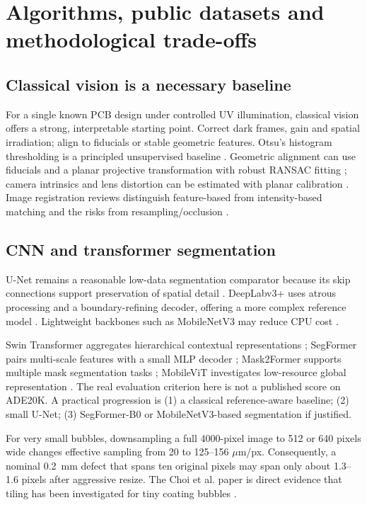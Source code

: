\section{Algorithms, public datasets and methodological trade-offs}
\subsection{Classical vision is a necessary baseline}
For a single known PCB design under controlled UV illumination, classical vision offers a strong, interpretable starting point. Correct dark frames, gain and spatial irradiation; align to fiducials or stable geometric features. Otsu's histogram thresholding is a principled unsupervised baseline \citep{otsu1979}. Geometric alignment can use fiducials and a planar projective transformation with robust RANSAC fitting \citep{fischler1981ransac}; camera intrinsics and lens distortion can be estimated with planar calibration \citep{zhang2000calibration}. Image registration reviews distinguish feature-based from intensity-based matching and the risks from resampling/occlusion \citep{zitova2003registration}.

\subsection{CNN and transformer segmentation}
U-Net remains a reasonable low-data segmentation comparator because its skip connections support preservation of spatial detail \citep{ronneberger2015unet}. DeepLabv3+ uses atrous processing and a boundary-refining decoder, offering a more complex reference model \citep{chen2018deeplab}. Lightweight backbones such as MobileNetV3 may reduce CPU cost \citep{howard2019mobile}.

Swin Transformer aggregates hierarchical contextual representations \citep{liu2021swin}; SegFormer pairs multi-scale features with a small MLP decoder \citep{xie2021segformer}; Mask2Former supports multiple mask segmentation tasks \citep{cheng2022mask2former}; MobileViT investigates low-resource global representation \citep{mehta2022mobilevit}. The real evaluation criterion here is not a published score on ADE20K. A practical progression is (1) a classical reference-aware baseline; (2) small U-Net; (3) SegFormer-B0 or MobileNetV3-based segmentation if justified.

For very small bubbles, downsampling a full 4000-pixel image to 512 or 640 pixels wide changes effective sampling from 20 to 125--156 $\mu$m/px. Consequently, a nominal 0.2~mm defect that spans ten original pixels may span only about 1.3--1.6 pixels after aggressive resize. The Choi et al. paper is direct evidence that tiling has been investigated for tiny coating bubbles \citep{choi2024uv}.

